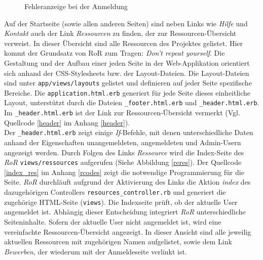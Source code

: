 \documentclass[a4paper,12pt,parskip,bibtotoc,liststotoc]{article}
\begin{document}
\begin{figure}[h!]
  \begin{center}
    \caption{Fehleranzeige bei der Anmeldung}  \label{Fehler}
  \end{center}
\end{figure}

Auf der Startseite (sowie allen anderen Seiten) sind neben Links wie \textit{Hilfe} und \textit{Kontakt} auch der Link \textit{Ressourcen} zu finden, der zur Ressourcen-Übersicht verweist. In dieser Übersicht sind alle Ressourcen des Projektes gelistet. Hier kommt der Grundsatz von RoR zum Tragen: \textit{Don’t repeat yourself}. Die Gestaltung und der Aufbau einer jeden Seite in der Web-Applikation orientiert sich anhand der CSS-Stylesheets bzw. der Layout-Dateien. Die Layout-Dateien sind unter \texttt{app/views/layouts} gelistet und definieren auf jeder Seite spezifische Bereiche. Die \texttt{application.html.erb} generiert für jede Seite dieses einheitliche Layout, unterstützt durch die Dateien \texttt{\_footer.html.erb} und \texttt{\_header.html.erb}. Im \texttt{\_header.html.erb} ist der Link zur Ressourcen-Übersicht vermerkt (Vgl. Quellcode \ref{header} im Anhang \ref{header}).\\
\newpage
Der \texttt{\_header.html.erb} zeigt einige \textit{If}-Befehle, mit denen unterschiedliche Daten anhand der Eigenschaften unangemeldeten, angemeldeten und Admin-Usern angezeigt werden. Durch Folgen des Links \textit{Ressource} wird die Index-Seite des \textit{RoR} \texttt{views/ressources} aufgerufen (Siehe Abbildung \ref{reres}). Der Quellcode \ref{index_res} im Anhang \ref{rcodes} zeigt die notwendige Programmierung für die Seite. \textit{RoR} durchläuft aufgrund der Aktivierung des Links die Aktion \textit{index} des dazugehörigen Controllers \texttt{resources\_controller.rb} und generiert die zugehörige HTML-Seite (\texttt{views}). Die Indexseite prüft, ob der aktuelle User angemeldet ist. Abhängig dieser Entscheidung integriert \textit{RoR} unterschiedliche Seiteninhalte. Sofern der aktuelle User nicht angemeldet ist, wird eine vereinfachte Ressourcen-Übersicht angezeigt. In dieser Ansicht sind alle jeweilig aktuellen Ressourcen mit zugehörigen Namen aufgelistet, sowie dem Link \textit{Bewerben}, der wiederum mit der Anmeldeseite verlinkt ist.\\
\end{document}
